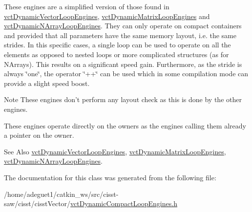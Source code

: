 These engines are a simplified version of those found in \hyperlink{classvct_dynamic_vector_loop_engines}{vct\-Dynamic\-Vector\-Loop\-Engines}, \hyperlink{classvct_dynamic_matrix_loop_engines}{vct\-Dynamic\-Matrix\-Loop\-Engines} and \hyperlink{classvct_dynamic_n_array_loop_engines}{vct\-Dynamic\-N\-Array\-Loop\-Engines}. They can only operate on compact containers and provided that all parameters have the same memory layout, i.\-e. the same strides. In this specific cases, a single loop can be used to operate on all the elements as opposed to nested loops or more complicated structures (as for N\-Arrays). This results on a significant speed gain. Furthermore, as the stride is always \char`\"{}one\char`\"{}, the operator \char`\"{}++\char`\"{} can be used which in some compilation mode can provide a slight speed boost.

\begin{DoxyNote}{Note}
These engines don't perform any layout check as this is done by the other engines.

These engines operate directly on the owners as the engines calling them already a pointer on the owner.
\end{DoxyNote}
\begin{DoxySeeAlso}{See Also}
\hyperlink{classvct_dynamic_vector_loop_engines}{vct\-Dynamic\-Vector\-Loop\-Engines}, \hyperlink{classvct_dynamic_matrix_loop_engines}{vct\-Dynamic\-Matrix\-Loop\-Engines}, \hyperlink{classvct_dynamic_n_array_loop_engines}{vct\-Dynamic\-N\-Array\-Loop\-Engines}. 
\end{DoxySeeAlso}


The documentation for this class was generated from the following file\-:\begin{DoxyCompactItemize}
\item 
/home/adeguet1/catkin\-\_\-ws/src/cisst-\/saw/cisst/cisst\-Vector/\hyperlink{vct_dynamic_compact_loop_engines_8h}{vct\-Dynamic\-Compact\-Loop\-Engines.\-h}\end{DoxyCompactItemize}
